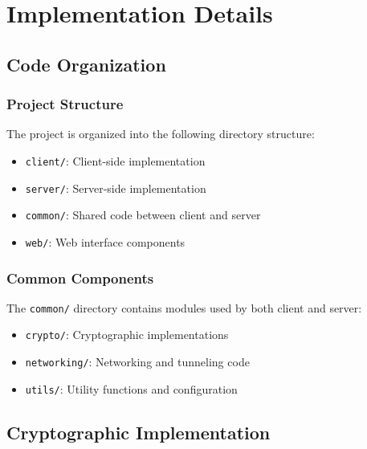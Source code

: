 \documentclass[12pt,a4paper]{report}
\begin{document}
\chapter{Implementation Details}
\section{Code Organization}
\subsection{Project Structure}
The project is organized into the following directory structure:
\begin{itemize}
    \item \texttt{client/}: Client-side implementation
    \item \texttt{server/}: Server-side implementation
    \item \texttt{common/}: Shared code between client and server
    \item \texttt{web/}: Web interface components
\end{itemize}

\subsection{Common Components}
The \texttt{common/} directory contains modules used by both client and server:
\begin{itemize}
    \item \texttt{crypto/}: Cryptographic implementations
    \item \texttt{networking/}: Networking and tunneling code
    \item \texttt{utils/}: Utility functions and configuration
\end{itemize}

\section{Cryptographic Implementation}
\end{document}
